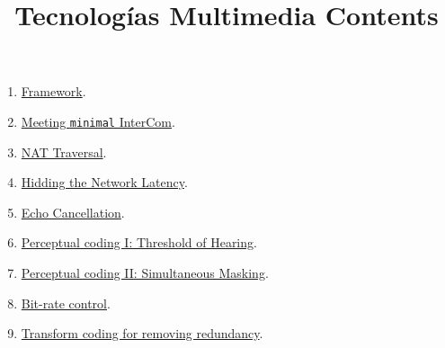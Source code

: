 
\title{Tecnologías Multimedia \newline Contents}

\maketitle

\begin{enumerate}
\item \href{https://tecnologias-multimedia.github.io/contents/framework/}{Framework}. %
\item \href{https://tecnologias-multimedia.github.io/contents/minimal/}{Meeting \texttt{minimal} InterCom}. %
\item \href{https://tecnologias-multimedia.github.io/contents/NAT_traversal/}{NAT Traversal}. %
\item \href{https://tecnologias-multimedia.github.io/contents/latency/}{Hidding the Network Latency}. %
\item \href{https://tecnologias-multimedia.github.io/contents/echo_cancellation/}{Echo Cancellation}. %
\item \href{https://tecnologias-multimedia.github.io/contents/threshold_of_hearing/}{Perceptual coding I: Threshold of Hearing}.
\item \href{https://tecnologias-multimedia.github.io/contents/simultaneous_masking/}{Perceptual coding II: Simultaneous Masking}.
\item \href{https://tecnologias-multimedia.github.io/contents/BR_control/}{Bit-rate control}. %
\item \href{https://tecnologias-multimedia.github.io/contents/transform_coding/}{Transform coding for removing redundancy}. %
\end{enumerate}



